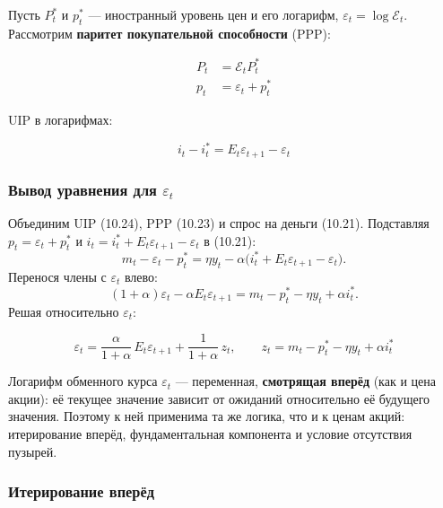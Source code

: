 \documentclass[10pt,a4paper]{article}
\begin{document}
Пусть $P^{*}_t$ и $p^{*}_t$ — иностранный уровень цен и его логарифм, $\varepsilon_t=\log\mathcal{E}_t$. Рассмотрим \textbf{паритет покупательной способности} (PPP):
\begin{formulabox}
\begin{align}
P_t &= \mathcal{E}_t P^{*}_t \tag{10.22}\\
p_t &= \varepsilon_t + p^{*}_t \tag{10.23}
\end{align}
\end{formulabox}
UIP в логарифмах:
\begin{formulabox}
\begin{equation}
i_t - i^{*}_t = E_t\varepsilon_{t+1}-\varepsilon_t \tag{10.24}
\end{equation}
\end{formulabox}

\subsubsection{Вывод уравнения для $\varepsilon_t$}

Объединим UIP (10.24), PPP (10.23) и спрос на деньги (10.21). Подставляя $p_t=\varepsilon_t+p^{*}_t$ и $i_t=i^{*}_t+E_t\varepsilon_{t+1}-\varepsilon_t$ в (10.21):
$$m_t - \varepsilon_t - p^{*}_t = \eta y_t - \alpha\big(i^{*}_t + E_t\varepsilon_{t+1}-\varepsilon_t\big).$$
Перенося члены с $\varepsilon_t$ влево:
$$(1+\alpha)\varepsilon_t - \alpha E_t\varepsilon_{t+1} = m_t - p^{*}_t - \eta y_t + \alpha i^{*}_t.$$
Решая относительно $\varepsilon_t$:
\begin{formulabox}
\begin{equation}
\varepsilon_t = \frac{\alpha}{1+\alpha}\,E_t\varepsilon_{t+1} + \frac{1}{1+\alpha}\,z_t, \qquad z_t = m_t - p^{*}_t - \eta y_t + \alpha i^{*}_t \tag{10.25}
\end{equation}
\end{formulabox}

\begin{intuition}
Логарифм обменного курса $\varepsilon_t$ — переменная, \textbf{смотрящая вперёд} (как и цена акции): её текущее значение зависит от ожиданий относительно её будущего значения. Поэтому к ней применима та же логика, что и к ценам акций: итерирование вперёд, фундаментальная компонента и условие отсутствия пузырей.
\end{intuition}

\subsubsection{Итерирование вперёд}
\end{document}
